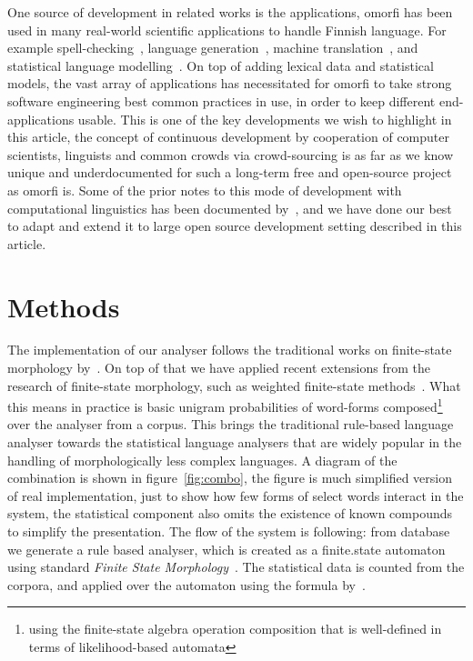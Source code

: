 \documentclass[a4paper,12pt]{article}
\begin{document}
One source of development in related works is the applications, omorfi has been
used in many real-world scientific applications to handle Finnish language.
For example spell-checking~\citep{pirinen2014weighted}, language
generation~\citep{toivanen2012corpus}, machine
translation~\citep{clifton2011combining,rubino2015abumatran}, and statistical
language modelling~\citep{haverinen2013building,bohnet2013joint}. On top of
adding lexical data and statistical models, the vast array of applications has
necessitated for omorfi to take strong software engineering best common
practices in use, in order to keep different end-applications usable. This is
one of the key developments we wish to highlight in this article, the concept
of continuous development by cooperation of computer scientists, linguists and
common crowds via crowd-sourcing is as far as we know unique and
underdocumented for such a long-term free and open-source project as omorfi is.
Some of the prior notes to this mode of development with computational
linguistics has been documented by~\citet{maxwell2008joint}, and we have done
our best to adapt and extend it to large open source development setting
described in this article.




\section{Methods}
\label{sec:methods}

The implementation of our analyser follows the traditional works on finite-state
morphology by~\citet{beesley2003finite}. On top of that we have applied recent
extensions from the research of finite-state morphology, such as weighted
finite-state methods~\citep{openfst,hfst2012}. What this means in practice is
basic unigram probabilities of word-forms composed\footnote{using the
    finite-state algebra operation composition that is well-defined in terms of
likelihood-based automata} over the analyser from a corpus.  This brings the
traditional rule-based language analyser towards the statistical language
analysers that are widely popular in the handling of morphologically less
complex languages. A diagram of the combination is shown in 
figure~\ref{fig:combo}, the figure is much simplified version of real
implementation, just to show how few forms of select words interact in the system, the
statistical component also omits the existence of known compounds to simplify
the presentation. The flow of the system is following: from database we generate
a rule based analyser, which is created as a finite.state automaton using
standard \textit{Finite State Morphology}~\citep{beesley2003finite}. The
statistical data is counted from the corpora, and applied over the automaton
using the formula by~\cite{pirinen2009weighted}.
\end{document}
